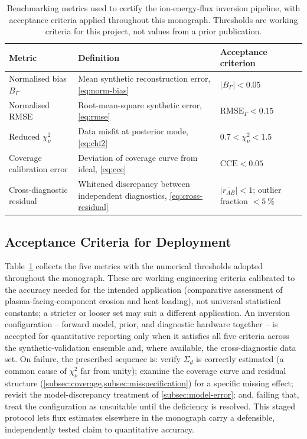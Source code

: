 \begin{table}[htbp]
\centering
\caption{Benchmarking metrics used to certify the ion-energy-flux inversion pipeline, with acceptance criteria applied throughout this monograph. Thresholds are working criteria for this project, not values from a prior publication.}
\label{tab:acceptance-criteria}
\begin{tabular}{@{}p{2.8cm}p{5.4cm}p{4.4cm}@{}}
\toprule
Metric & Definition & Acceptance criterion \\
\midrule
Normalised bias $B_{\Gamma}$ & Mean synthetic reconstruction error, \cref{eq:norm-bias} & $|B_{\Gamma}| < \num{0.05}$ \\
Normalised RMSE & Root-mean-square synthetic error, \cref{eq:rmse} & $\text{RMSE}_{\Gamma} < \num{0.15}$ \\
Reduced $\chi^{2}_{\nu}$ & Data misfit at posterior mode, \cref{eq:chi2} & $\num{0.7} < \chi_{\nu}^{2} < \num{1.5}$ \\
Coverage calibration error & Deviation of coverage curve from ideal, \cref{eq:cce} & $\text{CCE} < \num{0.05}$ \\
Cross-diagnostic residual & Whitened discrepancy between independent diagnostics, \cref{eq:cross-residual} & $|\overline{r_{AB}}| < \num{1}$; outlier fraction $< \SI{5}{\percent}$ \\
\bottomrule
\end{tabular}
\end{table}

\subsection{Acceptance Criteria for Deployment}
\label{subsec:acceptance}

Table~\ref{tab:acceptance-criteria} collects the five metrics with the numerical thresholds adopted throughout the monograph. These are working engineering criteria calibrated to the accuracy needed for the intended application (comparative assessment of plasma-facing-component erosion and heat loading), not universal statistical constants; a stricter or looser set may suit a different application. An inversion configuration -- forward model, prior, and diagnostic hardware together -- is accepted for quantitative reporting only when it satisfies all five criteria across the synthetic-validation ensemble and, where available, the cross-diagnostic data set. On failure, the prescribed sequence is: verify $\Sigma_{d}$ is correctly estimated (a common cause of $\chi_{\nu}^{2}$ far from unity); examine the coverage curve and residual structure (\cref{subsec:coverage,subsec:misspecification}) for a specific missing effect; revisit the model-discrepancy treatment of \cref{subsec:model-error}; and, failing that, treat the configuration as unsuitable until the deficiency is resolved. This staged protocol lets flux estimates elsewhere in the monograph carry a defensible, independently tested claim to quantitative accuracy.


